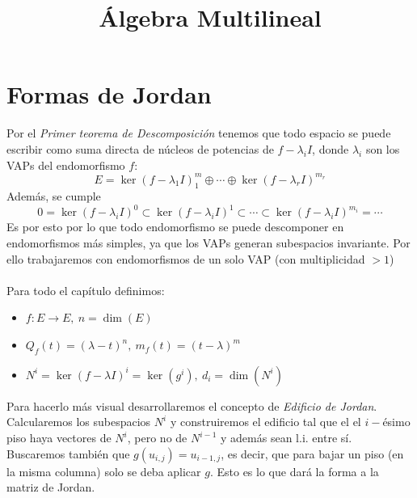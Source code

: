 \documentclass{myclass}
\title{Álgebra Multilineal}
\begin{document}
\maketitle
\tableofcontents
\newpage

\section{Formas de Jordan}
Por el \textit{Primer teorema de Descomposición} tenemos que todo espacio se puede escribir como suma directa de núcleos de potencias de $f-\lambda_iI$, donde $\lambda_i$ son los VAPs del endomorfismo $f$:
$$
E = \ker(f-\lambda_1I)^m_1 \oplus \cdots \oplus \ker(f-\lambda_rI)^{m_r}
$$
Además, se cumple
$$
0 = \ker(f-\lambda_iI)^0\subset \ker(f-\lambda_iI)^1 \subset \cdots \subset \ker(f-\lambda_iI)^{m_i}=\cdots
$$
Es por esto por lo que todo endomorfismo se puede descomponer en endomorfismos más simples, ya que los VAPs generan subespacios invariante. Por ello trabajaremos con endomorfismos de un solo VAP (con multiplicidad $>1$) \\
\\
Para todo el capítulo definimos:
\begin{itemize}
    \item $f:E\to E,\ n = \dim (E)$
    \item $Q_f(t) = (\lambda - t)^n,\ m_f(t) = (t-\lambda)^m$
    \item $N^i = \ker(f-\lambda I)^i = \ker(g^i),\ d_i = \dim(N^i)$
\end{itemize}
Para hacerlo más visual desarrollaremos el concepto de \textit{Edificio de Jordan}. Calcularemos los subespacios $N^i$ y construiremos el edificio tal que el el $i-$ésimo piso haya vectores de $N^i$, pero no de $N^{i-1}$ y además sean l.i. entre sí. Buscaremos también que $g(u_{i,j})=u_{i-1, j}$, es decir, que para bajar un piso (en la misma columna) solo se deba aplicar $g$. Esto es lo que dará la forma a la matriz de Jordan.
\end{document}
